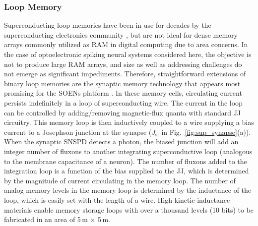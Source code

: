 \documentclass[twocolumn]{article}
\begin{document}
\subsubsection{Loop Memory}\label{Loops}
Superconducting loop memories have been in use for decades by the superconducting electronics community \cite{vatu1998,ka1999}, but are not ideal for dense memory arrays commonly utilized as RAM in digital computing due to area concerns. In the case of optoelectronic spiking neural systems considered here, the objective is not to produce large RAM arrays, and size as well as addressing challenges do not emerge as significant impediments. Therefore, straightforward extensions of binary loop memories are the synaptic memory technology that appears most promising for the SOENs platform \cite{sh2018,shainline2019superconducting}. In these memory cells, circulating current persists indefinitely in a loop of superconducting wire. The current in the loop can be controlled by adding/removing magnetic-flux quanta with standard JJ circuitry. This memory loop is then inductively coupled to a wire supplying a bias current to a Josephson junction at the synapse ($J_{\mathrm{sf}}$ in Fig.\, \ref{fig:sup_synapse}(a)). When the synaptic SNSPD detects a photon, the biased junction will add an integer number of fluxons to another integrating superconductive loop (analogous to the membrane capacitance of a neuron). The number of fluxons added to the integration loop is a function of the bias supplied to the JJ, which is determined by the magnitude of current circulating in the memory loop. The number of analog memory levels in the memory loop is determined by the inductance of the loop, which is easily set with the length of a wire. High-kinetic-inductance materials \cite{tobo2018} enable memory storage loops with over a thousand levels (10 bits) to be fabricated in an area of 5\,\textmu m $\times$ 5\,\textmu m. 
\end{document}
